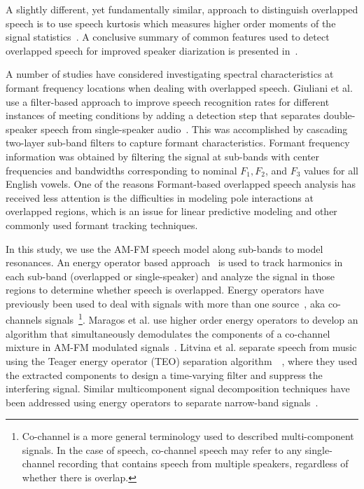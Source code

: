 A slightly different, yet fundamentally similar, approach to distinguish overlapped speech is to use speech kurtosis which measures higher order moments of the signal statistics~\cite{Wrigley_05}. 
A conclusive summary of common features used to detect overlapped speech for improved speaker diarization is presented in~\cite{boakye_thesis}. 


A number of studies have considered investigating spectral characteristics at formant frequency locations when dealing with overlapped speech. 
Giuliani et al. use a filter-based approach to improve speech recognition rates for different instances of meeting conditions by adding a detection step that separates double-speaker speech from single-speaker audio~\cite{giuliani_meeting}. 
This was accomplished by cascading two-layer sub-band filters to capture formant characteristics. 
Formant frequency information was obtained by filtering the signal at sub-bands with center frequencies and bandwidths corresponding to nominal ${F_1, F_2}$, and ${F_3}$ values for all English vowels. 
One of the reasons Formant-based overlapped speech analysis has received less attention is the difficulties in modeling pole interactions at overlapped regions, which is an issue for linear predictive modeling and other commonly used formant tracking techniques. 

In this study, we use the AM-FM speech model along sub-bands\cite{maragos_kaiser_quatieri} to model resonances. An energy operator based approach~\cite{kaiser_teopaper,maragos_kaiser_quatieri} is used to track harmonics in each sub-band (overlapped or single-speaker) and analyze the signal in those regions to determine whether speech is overlapped. 
Energy operators have previously been used to deal with signals with more than one source~\cite{maragos_instantaneousenergy}, aka co-channels signals~\footnote{Co-channel is a more general terminology used to described multi-component signals. In the case of speech, co-channel speech may refer to any single-channel recording that contains speech from multiple speakers, regardless of whether there is overlap.}. 
Maragos et al. use higher order energy operators to develop an algorithm that simultaneously demodulates the components of a co-channel mixture in AM-FM modulated signals~\cite{maragos_instantaneousenergy}. 
Litvina et al. separate speech from music using the Teager energy operator (TEO) separation algorithm~\cite{maragos_kaiser_quatieri}~\cite{Litvin2010}, where they used the extracted components to design a time-varying filter and suppress the interfering signal. 
Similar multicomponent signal decomposition techniques have been addressed using energy operators to separate narrow-band signals~\cite{Linicassp95,hu12_nullspacepersuit,santhanam_maragos_2000}. 

